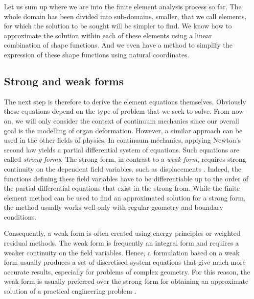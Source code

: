 Let us sum up where we are into the finite element analysis process so far. The whole domain has been divided into sub-domains, smaller, that we call elements, for which the solution to be sought will be simpler to find. We know how to approximate the solution within each of these elements using a linear combination of shape functions. And we even have a method to simplify the expression of these shape functions using natural coordinates. 

	\subsection{Strong and weak forms}
	
The next step is therefore to derive the element equations themselves. Obviously these equations depend on the type of problem that we seek to solve. From now on, we will only consider the context of continuum mechanics since our overall goal is the modelling of organ deformation. However, a similar approach can be used in the other fields of physics. In continuum mechanics, applying Newton's second law yields a partial differential system of equations. Such equations are called \emph{strong forms}. The strong form, in contrast to a \emph{weak form}, requires strong continuity on the dependent field variables, such as displacements \citep{Liu03}. \ON Indeed, \OFF the functions defining these field variables have to be differentiable up to the order of the partial differential equations that exist in the strong from. \ON While the finite element method can be used to find an approximated solution for a strong form,  the method usually works well only with regular geometry and boundary conditions. 

Consequently, \OFF a weak form is often created using energy principles or weighted residual methods. The weak form is frequently an integral form and requires a weaker continuity on the field variables. \ON Hence, \OFF a formulation based on a weak form usually produces a set of discretised system equations that give much more accurate results, especially for problems of complex geometry. \ON For this reason, \OFF the weak form is usually preferred \ON over the strong form for obtaining an approximate solution of a practical engineering problem \OFF.

